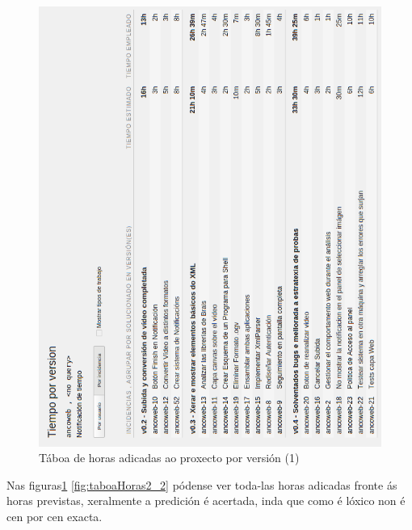 \begin{figure}[htp]
\begin{center}
    \includegraphics[scale=0.7]{figures/YouTrack/taboaHoras2_1.png}
    \caption{Táboa de horas adicadas ao proxecto por versión (1)}
\label{fig:taboaHoras2_1}
\end{center}
\end{figure}

Nas figuras\ref{fig:taboaHoras2_1} \ref{fig:taboaHoras2_2} pódense ver toda-las horas adicadas 
fronte ás horas previstas, xeralmente a predición é acertada, inda que como é lóxico non é cen por
cen exacta.


